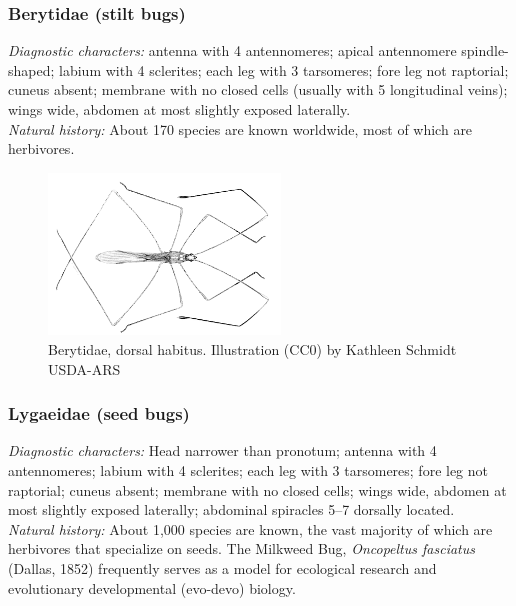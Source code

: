 \documentclass[letterpaper, 11pt]{article}
\begin{document}
\subsubsection{Berytidae (stilt bugs)}
\noindent{}\textit{Diagnostic characters:} antenna with 4 antennomeres; apical antennomere spindle-shaped; labium with 4 sclerites; each leg with 3 tarsomeres; fore leg not raptorial; cuneus absent; membrane with no closed cells (usually with 5 longitudinal veins); wings wide, abdomen at most slightly exposed laterally.\\

\noindent{}\textit{Natural history:} About 170 species are known worldwide, most of which are herbivores.\\

\begin{figure}[ht!]
 \centering
 \includegraphics[width=0.55\textwidth]{BerytidHabitus.png}
 \caption{Berytidae, dorsal habitus. Illustration (CC0) by Kathleen Schmidt USDA-ARS}
 \label{fig:berytid1}
\end{figure}

\subsubsection{Lygaeidae (seed bugs)}
\noindent{}\textit{Diagnostic characters:} Head narrower than pronotum; antenna with 4 antennomeres; labium with 4 sclerites; each leg with 3 tarsomeres; fore leg not raptorial; cuneus absent; membrane with no closed cells; wings wide, abdomen at most slightly exposed laterally; abdominal spiracles 5--7 dorsally located.\\

\noindent{}\textit{Natural history:} About 1,000 species are known, the vast majority of which are herbivores that specialize on seeds. The Milkweed Bug, \textit{Oncopeltus fasciatus} (Dallas, 1852) frequently serves as a model for ecological research and evolutionary developmental (evo-devo) biology. \\
\end{document}
